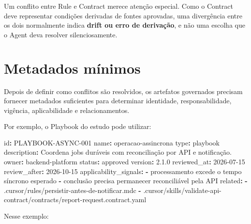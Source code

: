 \documentclass[
  10pt,
  a4paper,
  oneside]{book}
\newenvironment{Shaded}{}{}
\newcommand{\AttributeTok}[1]{\textcolor[rgb]{0.49,0.56,0.16}{#1}}
\newcommand{\FloatTok}[1]{\textcolor[rgb]{0.25,0.63,0.44}{#1}}
\newcommand{\FunctionTok}[1]{\textcolor[rgb]{0.02,0.16,0.49}{#1}}
\newcommand{\KeywordTok}[1]{\textcolor[rgb]{0.00,0.44,0.13}{\textbf{#1}}}
\renewenvironment{Shaded}{\begin{snugshade}}{\end{snugshade}}%
\begin{document}
Um conflito entre Rule e Contract merece atenção especial. Como o
Contract deve representar condições derivadas de fontes aprovadas, uma
divergência entre os dois normalmente indica \textbf{drift ou erro de
derivação}, e não uma escolha que o Agent deva resolver silenciosamente.

\hypertarget{metadados-muxednimos}{%
\section{Metadados mínimos}\label{metadados-muxednimos}}

Depois de definir como conflitos são resolvidos, os artefatos governados
precisam fornecer metadados suficientes para determinar identidade,
responsabilidade, vigência, aplicabilidade e relacionamentos.

Por exemplo, o Playbook do estudo pode utilizar:

\begin{Shaded}
\begin{Highlighting}[]
\FunctionTok{id}\KeywordTok{:}\AttributeTok{ PLAYBOOK{-}ASYNC{-}001}
\FunctionTok{name}\KeywordTok{:}\AttributeTok{ operacao{-}assincrona}
\FunctionTok{type}\KeywordTok{:}\AttributeTok{ playbook}
\FunctionTok{description}\KeywordTok{:}\AttributeTok{ Coordena jobs duráveis com reconciliação por API e notificação.}
\FunctionTok{owner}\KeywordTok{:}\AttributeTok{ backend{-}platform}
\FunctionTok{status}\KeywordTok{:}\AttributeTok{ approved}
\FunctionTok{version}\KeywordTok{:}\AttributeTok{ }\FloatTok{2.1.0}
\FunctionTok{reviewed\_at}\KeywordTok{:}\AttributeTok{ 2026{-}07{-}15}
\FunctionTok{review\_after}\KeywordTok{:}\AttributeTok{ 2026{-}10{-}15}
\FunctionTok{applicability\_signals}\KeywordTok{:}
\AttributeTok{  }\KeywordTok{{-}}\AttributeTok{ processamento excede o tempo síncrono esperado}
\AttributeTok{  }\KeywordTok{{-}}\AttributeTok{ conclusão precisa permanecer reconciliável pela API}
\FunctionTok{related}\KeywordTok{:}
\AttributeTok{  }\KeywordTok{{-}}\AttributeTok{ .cursor/rules/persistir{-}antes{-}de{-}notificar.mdc}
\AttributeTok{  }\KeywordTok{{-}}\AttributeTok{ .cursor/skills/validate{-}api{-}contract/contracts/report{-}request.contract.yaml}
\end{Highlighting}
\end{Shaded}

Nesse exemplo:
\end{document}
